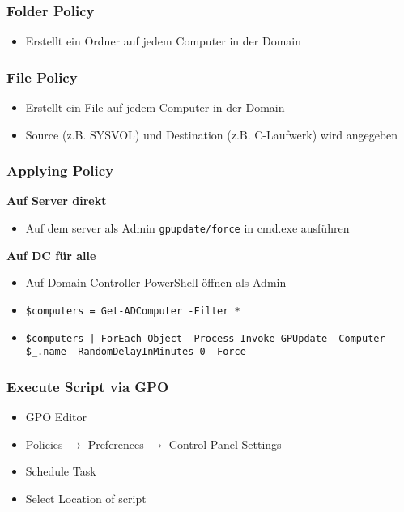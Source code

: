 \subsubsection{Folder Policy}
\begin{itemize}
    \item Erstellt ein Ordner auf jedem Computer in der Domain
\end{itemize}

\subsubsection{File Policy}
\begin{itemize}
    \item Erstellt ein File auf jedem Computer in der Domain
    \item Source (z.B. SYSVOL) und Destination (z.B. C-Laufwerk) wird angegeben
\end{itemize}

\subsubsection{Applying Policy}
\textbf{Auf Server direkt}
\begin{itemize}
    \item Auf dem server als Admin \texttt{\small gpupdate/force} in cmd.exe ausführen
\end{itemize}

\textbf{Auf DC für alle}
\begin{itemize}
    \item Auf Domain Controller PowerShell öffnen als Admin
    \item \texttt{\small \$computers = Get-ADComputer -Filter *}
    \item \texttt{\small \$computers | ForEach-Object -Process {Invoke-GPUpdate -Computer \$\_.name -RandomDelayInMinutes 0 -Force}}
\end{itemize}

\subsubsection{Execute Script via GPO}
\begin{itemize}
    \item GPO Editor
    \item Policies $\rightarrow$ Preferences $\rightarrow$ Control Panel Settings
    \item Schedule Task
    \item Select Location of script
\end{itemize}

